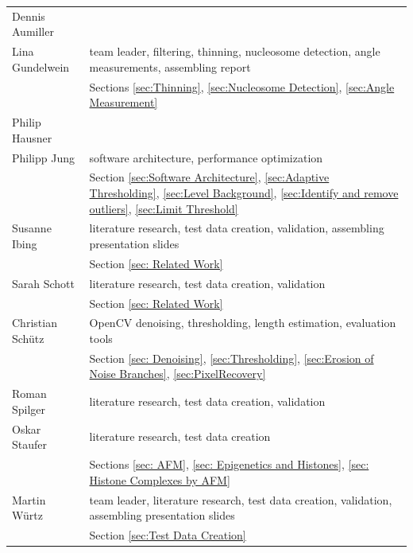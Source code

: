 \documentclass{article}
\begin{document}
\begin{table}[htb]\label{tab: tasks}
\begin{tabular}{p{2.8cm}p{8.3cm}}
Dennis Aumiller &\\[1em]
Lina Gundelwein & team leader, filtering, thinning, nucleosome detection, angle measurements, assembling report\\
&Sections \ref{sec:Thinning}, \ref{sec:Nucleosome Detection}, \ref{sec:Angle Measurement}\\[1em]
Philip Hausner& \\[1em]
Philipp Jung &  software architecture, performance optimization\\
&Section \ref{sec:Software Architecture}, \ref{sec:Adaptive Thresholding}, \ref{sec:Level Background}, \ref{sec:Identify and remove outliers}, \ref{sec:Limit Threshold}\\[1em]
Susanne Ibing & literature research, test data creation, validation, assembling presentation slides\\
& Section \ref{sec: Related Work}\\[1em]
Sarah Schott & literature research, test data creation, validation\\
& Section \ref{sec: Related Work}\\[1em]
Christian Schütz& OpenCV denoising, thresholding, length estimation, evaluation tools\\[1em]
& Section \ref{sec: Denoising}, \ref{sec:Thresholding}, \ref{sec:Erosion of Noise Branches}, \ref{sec:PixelRecovery}\\[1em]
Roman Spilger& literature research, test data creation, validation\\[1em]
Oskar Staufer & literature research, test data creation \\
& Sections \ref{sec: AFM}, \ref{sec: Epigenetics and Histones}, \ref{sec: Histone Complexes by AFM} \\[1em]
Martin Würtz & team leader, literature research, test data creation, validation, assembling presentation slides\\
&Section \ref{sec:Test Data Creation}\\
\end{tabular}
\end{table}
\end{document}
